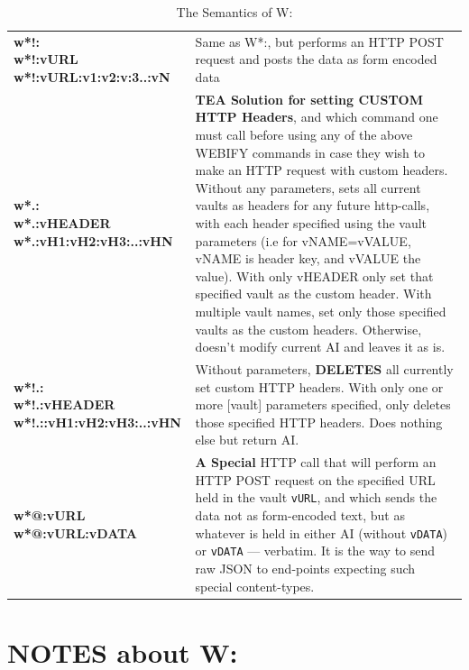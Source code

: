 \documentclass[a4paper, 18pt]{book} %
\begin{document}
{{{\begin{table}[H]
\begin{tabular}{>{\bfseries}m{0.4\linewidth} | m{0.6\linewidth}}
\rowcolor{lightgray}\bfseries \makecell[l]{w*!:\\w*!:vURL\\w*!:vURL:v1:v2:v:3..:vN} & Same as W*:, but performs an HTTP POST request and posts the data as form encoded data\\


\makecell[l]{w*.:\\w*.:vHEADER\\w*.:vH1:vH2:vH3:..:vHN} & \textbf{TEA Solution for setting CUSTOM HTTP Headers}, and which command one must call before using any of the above WEBIFY commands in case they wish to make an HTTP request with custom headers. Without any parameters, sets all current vaults as headers for any future http-calls, with each header specified using the vault parameters (i.e for vNAME=vVALUE, vNAME is header key, and vVALUE the value). With only vHEADER only set that specified vault as the custom header. With multiple vault names, set only those specified vaults as the custom headers. Otherwise, doesn't modify current AI and leaves it as is.\\


\rowcolor{lightgray}\bfseries \makecell[l]{w*!.:\\w*!.:vHEADER\\w*!.::vH1:vH2:vH3:..:vHN} & Without parameters, \textbf{DELETES} all currently set custom HTTP headers. With only one or more [vault] parameters specified, only deletes those specified HTTP headers. Does nothing else but return AI.\\


\makecell[l]{w*@:vURL\\w*@:vURL:vDATA} & \textbf{A Special} HTTP call that will perform an HTTP POST request on the specified URL held in the vault \texttt{vURL}, and which sends the data not as form-encoded text, but as whatever is held in either AI (without \texttt{vDATA}) or \texttt{vDATA} --- verbatim. It is the way to send raw JSON to end-points expecting such special content-types.\\



 \hline
\end{tabular}
\caption{The Semantics of W:}
\label{TABSEMW}
\end{table}


\section{NOTES about W:}
\label{SECNOTEW} 

}}}
\end{document}
